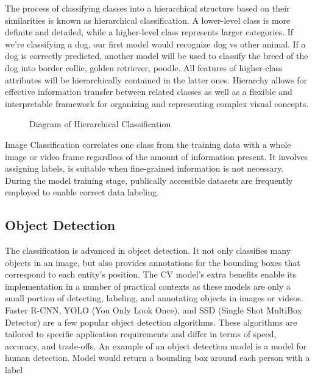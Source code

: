 	
	
	The process of classifying classes into a hierarchical structure based on their similarities is known as hierarchical classification. A lower-level class is more definite and detailed, while a higher-level class represents larger categories. If we're classifying a dog, our first model would recognize dog vs other animal. If a dog is correctly predicted, another model will be used to classify the breed of the dog into border collie, golden retriever, poodle. All features of higher-class attributes will be hierarchically contained in the latter ones. Hierarchy allows for effective information transfer between related classes as well as a flexible and interpretable framework for organizing and representing complex visual concepts.


\begin{figure}[ht]
	\centering
	\caption{Diagram of Hierarchical Classification}
\end{figure}


Image Classification correlates one class from the training data with a whole image or video frame regardless of the amount of information present. It involves assigning labels, is suitable when fine-grained information is not necessary. During the model training stage, publically accessible datasets are frequently employed to enable correct data labeling.



\subsection*{Object Detection}
	The classification is advanced in object detection. It not only classifies many objects in an image, but also provides annotations for the bounding boxes that correspond to each entity's position. The CV model's extra benefits enable its implementation in a number of practical contexts as these models are only a small portion of detecting, labeling, and annotating objects in images or videos. Faster R-CNN, YOLO (You Only Look Once), and SSD (Single Shot MultiBox Detector) are a few popular object detection algorithms. These algorithms are tailored to specific application requirements and differ in terms of speed, accuracy, and trade-offs.  An example of an object detection model is a model for human detection. Model would return a bounding box around each person with a label
	
